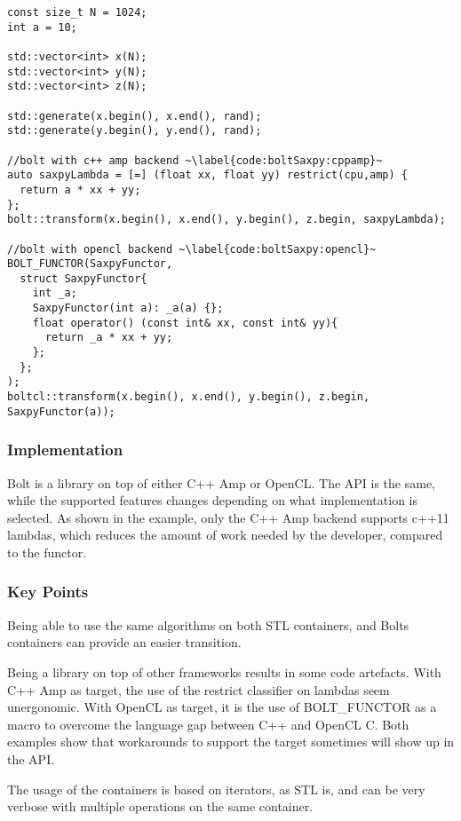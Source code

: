 \begin{lstlisting}[caption={Bolt saxpy example}, label={code:boltSaxpy}]
const size_t N = 1024;
int a = 10;

std::vector<int> x(N);
std::vector<int> y(N);
std::vector<int> z(N);

std::generate(x.begin(), x.end(), rand);
std::generate(y.begin(), y.end(), rand);

//bolt with c++ amp backend ~\label{code:boltSaxpy:cppamp}~
auto saxpyLambda = [=] (float xx, float yy) restrict(cpu,amp) {
  return a * xx + yy;
};
bolt::transform(x.begin(), x.end(), y.begin(), z.begin, saxpyLambda);

//bolt with opencl backend ~\label{code:boltSaxpy:opencl}~
BOLT_FUNCTOR(SaxpyFunctor,
  struct SaxpyFunctor{
    int _a;
    SaxpyFunctor(int a): _a(a) {};
    float operator() (const int& xx, const int& yy){
      return _a * xx + yy;
    };
  };
);
boltcl::transform(x.begin(), x.end(), y.begin(), z.begin, SaxpyFunctor(a));
\end{lstlisting}

\subsubsection{Implementation}
Bolt is a library on top of either C++ Amp or OpenCL. The API is the same, while the supported features changes depending on what implementation is selected.
As shown in the example, only the C++ Amp backend supports c++11 lambdas, which reduces the amount of work needed by the developer, compared to the functor.

\subsubsection{Key Points}
Being able to use the same algorithms on both STL containers, and Bolts containers can provide an easier transition.

Being a library on top of other frameworks results in some code artefacts. With C++ Amp as target, the use of the restrict classifier on lambdas seem unergonomic. With OpenCL as target, it is the use of BOLT_FUNCTOR as a macro to overcome the language gap between C++ and OpenCL C. Both examples show that workarounds to support the target sometimes will show up in the API. 

The usage of the containers is based on iterators, as STL is, and can be very verbose with multiple operations on the same container.


